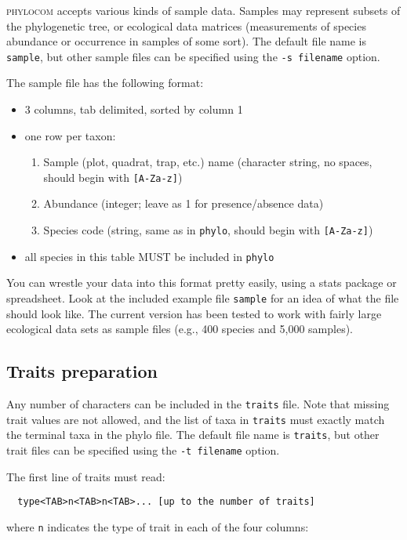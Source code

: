 \documentclass[12pt,letterpaper]{article}
\begin{document}
{\scshape phylocom} accepts various kinds of sample data. Samples may
represent subsets of the phylogenetic tree, or ecological data
matrices (measurements of species abundance or occurrence in samples
of some sort). The default file name is \verb|sample|, but other sample files
can be specified using the \verb|-s filename| option.

The sample file has the following format: 

\begin{itemize}
\item 3 columns, tab delimited, sorted by column 1
\item one row per taxon: 
\begin{enumerate}
\item Sample (plot, quadrat, trap,
etc.) name (character string, no spaces, should begin with \verb|[A-Za-z]|) 
\item Abundance (integer; leave as 1 for presence/absence data)
\item Species code (string, same as in \verb|phylo|, should begin with \verb|[A-Za-z]|) 
\end{enumerate}
\item all species in
this table MUST be included in \verb|phylo|
\end{itemize}
        
You can wrestle your data into this format pretty easily, using a
stats package or spreadsheet. Look at the included example file
\verb|sample| for an idea of what the file should look like.  The
current version has been tested to work with fairly large ecological
data sets as sample files (e.g., 400 species and 5,000 samples).

\subsection{Traits preparation}

Any number of characters can be included in the \verb|traits|
file. Note that missing trait values are not allowed, and the list of
taxa in \verb|traits| must exactly match the terminal taxa in the phylo
file. The default file name is \verb|traits|, but other trait files can be
specified using the \verb|-t filename| option.

The first line of traits must read:
\begin{verbatim}
  type<TAB>n<TAB>n<TAB>... [up to the number of traits]
\end{verbatim}
where \verb|n| indicates the type of trait in each of the four
columns:
\end{document}
